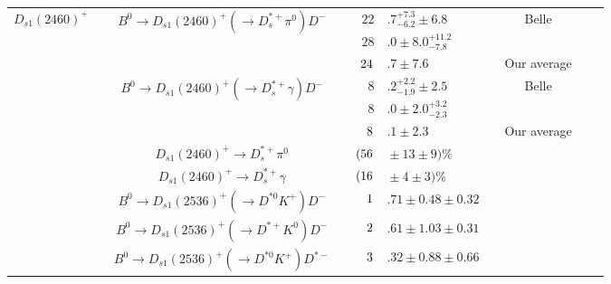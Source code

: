 \begin{adjustbox}{width=\textwidth,center}
{\begin{tabular}{cp{5pt}cp{5pt}r@{}lp{5pt}cp{5pt}c}
	\multirow{9}{*}[-5pt]{$D_{s1}(2460)^{+}$}	&&	\multirow{3}{*}{$B^{0}\to D_{s1}(2460)^{+}(\to D^{*+}_{s}\pi^{0})D^{-}$}	&&$	22$&$.7^{+7.3}_{-6.2}\pm6.8	$&&	Belle	&&	\cite{Krokovny:2003zq}        \\
		&&		&&$	28$&$.0\pm 8.0{}^{+11.2}_{-7.8}	$&&	\babar{}	&&	\cite{Aubert:2004pw}          \\  \cmidrule{4-9}
		&&		&\cellcolor{Gray}&$	\cellcolor{Gray}24$&\cellcolor{Gray}$.7 \pm 7.6	$&\cellcolor{Gray}&	\cellcolor{Gray}  Our average	&\cellcolor{Gray}&	\\ \cmidrule{3-9}
		&&	\multirow{3}{*}{$B^{0}\to D_{s1}(2460)^{+}(\to D^{*+}_{s}\gamma)D^{-}$}	&&$	8$&$.2^{+2.2}_{-1.9}\pm2.5	$&&	Belle	&&	\cite{Krokovny:2003zq}        \\
		&&		&&$	8$&$.0\pm 2.0{}^{+3.2}_{-2.3}	$&&	\babar{}	&&	\cite{Aubert:2004pw}          \\  \cmidrule{4-9}
		&&		&\cellcolor{Gray}&$	\cellcolor{Gray}8$&\cellcolor{Gray}$.1 \pm 2.3	$&\cellcolor{Gray}&	\cellcolor{Gray}  Our average	&\cellcolor{Gray}&	\\ \cmidrule{3-9}
		&&	$D_{s1}(2460)^{+}\to D^{*+}_{s}\pi^{0}$	&\cellcolor{LightGray} &$	\cellcolor{LightGray} (56$&\cellcolor{LightGray}${}\pm13\pm9)\%	$&\cellcolor{LightGray}&	\cellcolor{LightGray} \babar{}	&\cellcolor{LightGray}&	\cite{Aubert:2006nm}          \\ \cmidrule{3-9}
		&&	$D_{s1}(2460)^{+}\to D^{*+}_{s}\gamma$	&\cellcolor{LightGray} &$	\cellcolor{LightGray} (16$&\cellcolor{LightGray}${}\pm4\pm3)\%	$&\cellcolor{LightGray}&	\cellcolor{LightGray} \babar{}	&\cellcolor{LightGray}&	\cite{Aubert:2006nm}          \\ \midrule
		&&	\multirow{1}{*}{$B^{0}\to D_{s1}(2536)^{+}(\to D^{*0}K^{+})D^{-}$}	&\cellcolor{LightGray} &$	\cellcolor{LightGray} 1$&\cellcolor{LightGray}$.71\pm0.48\pm0.32	$&\cellcolor{LightGray}&	\cellcolor{LightGray} \babar{}	&\cellcolor{LightGray}&	\cite{Aubert:2007rva}         \\ \cmidrule{3-9}
		&&	\multirow{1}{*}{$B^{0}\to D_{s1}(2536)^{+}(\to D^{*+}K^{0})D^{-}$}	&\cellcolor{LightGray} &$	\cellcolor{LightGray} 2$&\cellcolor{LightGray}$.61\pm1.03\pm0.31	$&\cellcolor{LightGray}&	\cellcolor{LightGray} \babar{}	&\cellcolor{LightGray}&	\cite{Aubert:2007rva}         \\ \cmidrule{3-9}
		&&	\multirow{1}{*}{$B^{0}\to D_{s1}(2536)^{+}(\to D^{*0}K^{+})D^{*-}$}	&\cellcolor{LightGray} &$	\cellcolor{LightGray} 3$&\cellcolor{LightGray}$.32\pm0.88\pm0.66	$&\cellcolor{LightGray}&	\cellcolor{LightGray} \babar{}	&\cellcolor{LightGray}&	\cite{Aubert:2007rva}         \\ \cmidrule{3-9}

\end{tabular}}
\end{adjustbox}
